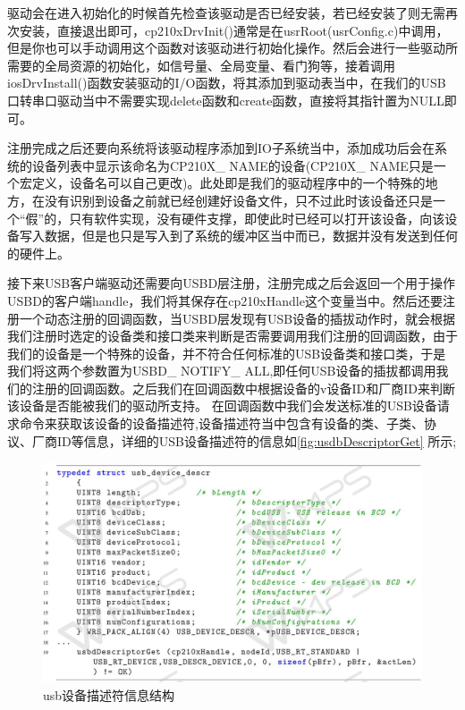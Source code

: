 	驱动会在进入初始化的时候首先检查该驱动是否已经安装，若已经安装了则无需再次安装，直接退出即可，cp210xDrvInit()通常是在usrRoot(usrConfig.c)中调用，但是你也可以手动调用这个函数对该驱动进行初始化操作。然后会进行一些驱动所需要的全局资源的初始化，如信号量、全局变量、看门狗等，接着调用iosDrvInstall()函数安装驱动的I/O函数，将其添加到驱动表当中，在我们的USB口转串口驱动当中不需要实现delete函数和create函数，直接将其指针置为NULL即可。
	
	注册完成之后还要向系统将该驱动程序添加到IO子系统当中，添加成功后会在系统的设备列表中显示该命名为CP210X\_ NAME的设备(CP210X\_ NAME只是一个宏定义，设备名可以自己更改)。此处即是我们的驱动程序中的一个特殊的地方，在没有识别到设备之前就已经创建好设备文件，只不过此时该设备还只是一个“假”的，只有软件实现，没有硬件支撑，即使此时已经可以打开该设备，向该设备写入数据，但是也只是写入到了系统的缓冲区当中而已，数据并没有发送到任何的硬件上。

	接下来USB客户端驱动还需要向USBD层注册，注册完成之后会返回一个用于操作USBD的客户端handle，我们将其保存在cp210xHandle这个变量当中。然后还要注册一个动态注册的回调函数，当USBD层发现有USB设备的插拔动作时，就会根据我们注册时选定的设备类和接口类来判断是否需要调用我们注册的回调函数，由于我们的设备是一个特殊的设备，并不符合任何标准的USB设备类和接口类，于是我们将这两个参数置为USBD\_ NOTIFY\_ ALL,即任何USB设备的插拔都调用我们的注册的回调函数。之后我们在回调函数中根据设备的v设备ID和厂商ID来判断该设备是否能被我们的驱动所支持。
	在回调函数中我们会发送标准的USB设备请求命令来获取该设备的设备描述符,设备描述符当中包含有设备的类、子类、协议、厂商ID等信息，详细的USB设备描述符的信息如\autoref{fig:usdbDescriptorGet} 所示;

\begin{figure}[!h]
\centering
\includegraphics[width=1.0\textwidth]{./graphics/usdbDescriptorGet.pdf}
\caption{usb设备描述符信息结构}\label{fig:usdbDescriptorGet}
\end{figure}

